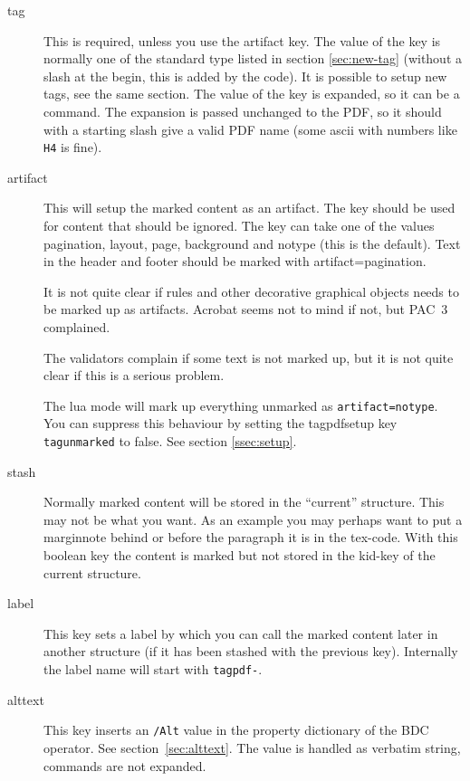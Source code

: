 \documentclass[DIV=12,parskip=half-,bibliography=totoc]{scrartcl}
\newcommand\PrintKeyName[1]{\textsf{#1}}
\newcommand\PDF{PDF}
\begin{document}
\begin{description}
  \item[\PrintKeyName{tag}]
  This is required, unless you use the \PrintKeyName{artifact} key. The value of the key is normally one of the standard type listed in section \ref{sec:new-tag} (without a slash at the begin, this is added by the code). It is possible to setup new tags, see the same section. The value of the key is expanded, so it can be a command. The expansion is passed unchanged to the \PDF{}, so it should with a starting slash give a valid \PDF{} name  (some ascii with numbers like \texttt{H4} is fine).

  \item[\PrintKeyName{artifact}]
  This will setup the marked content as an artifact. The key should be used for content that should be ignored. The key can take one of the values \PrintKeyName{pagination}, \PrintKeyName{layout},  \PrintKeyName{page},  \PrintKeyName{background} and \PrintKeyName{notype} (this is the default). Text in the header and footer should be marked with \PrintKeyName{artifact=pagination}.

  It is not quite clear if rules and other decorative graphical objects needs to be marked up as artifacts. Acrobat seems not to mind if not, but PAC~3 complained.

  The validators complain if some text is not marked up, but it is not quite clear if this is a serious problem.

  The lua mode will mark up everything unmarked as \texttt{artifact=notype}. You can suppress this behaviour by setting the tagpdfsetup key \texttt{tagunmarked} to false. See section \ref{ssec:setup}.

  \item[\PrintKeyName{stash}]
   Normally marked content will be stored in the \enquote{current} structure. This may not be what you want. As an example you may perhaps want to put a marginnote behind or before the paragraph it is in the tex-code. With this boolean key the content is marked but not stored in the kid-key of the current structure.

  \item[\PrintKeyName{label}]
  This key sets a label by which you can call the marked content later in another structure (if it has been stashed with the previous key). Internally the label name will start with \texttt{tagpdf-}.

  \item[\PrintKeyName{alttext}]
   This key inserts an \texttt{/Alt} value in the property dictionary of the BDC operator. See section~\ref{sec:alttext}. The value is handled as verbatim string, commands are not expanded.


\end{description}
\end{document}
